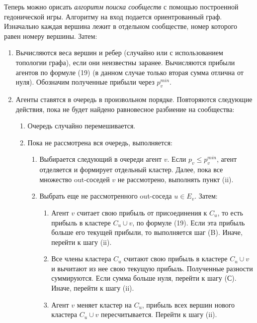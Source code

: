 Теперь можно орисать \textit{алгоритм поиска сообществ} с помощью построенной гедонической игры. Алгоритму на вход подается ориентрованный граф. Изначально каждая вершина лежит в отдельном сообществе, номер которого равен номеру вершины. Затем:
\begin{enumerate}
	\item Вычисляются веса вершин и ребер (случайно или с использованием топологии графа), если они неизвестны заранее. Вычисляются прибыли агентов по формуле (19) (в данном случае только вторая сумма отлична от нуля). Обозначим полученные прибыли через $p_v^{min}$.
	
	\item Агенты ставятся в очередь в произвольном порядке. Повторяются следующие действия, пока не будет найдено равновесное разбиение на сообщества:
	
	\begin{enumerate}
		\item Очередь случайно перемешивается. 
		\item Пока не рассмотрена вся очередь, выполняется:
		
		\begin{enumerate}
			\item Выбирается следующий в очереди агент $v$. Если $p_v \leq p_v^{min}$, агент отделяется и формирует отдельный кластер. Далее, пока все множество out-соседей $v$ не рассмотрено, выполнять пункт (ii).
			\item Выбрать еще не рассмотренного out-соседа $u\in E_v$. Затем:
		
			\begin{enumerate}
				\item Агент $v$ считает свою прибыль от присоединения к $C_u$, то есть прибыль в кластере $C_u\cup v$, по формуле (19). Если эта прибыль больше его текущей прибыли, то выполняется шаг (B). Иначе, перейти к шагу (ii).
				\item Все члены кластера $C_u$ считают свою прибыль в кластере $C_u\cup v$ и вычитают из нее свою текущую прибыль. Полученные разности суммируются. Если сумма больше нуля, перейти к шагу (С). Иначе, перейти к шагу (ii).
				\item Агент $v$ меняет кластер на $C_u$, прибыль всех вершин нового кластера $C_u\cup v$ пересчитывается. Перейти к шагу (ii).
			\end{enumerate}
		\end{enumerate}
	\end{enumerate} 
\end{enumerate}

